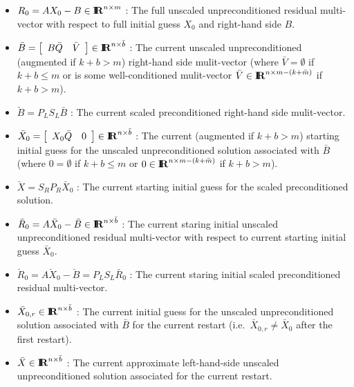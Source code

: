 \documentclass[pdf,ps2pdf,11pt]{SANDreport}
\begin{document}
\begin{itemize}

{}\item $R_0 = A X_0 - B {}\in\RE^{n {}\times m}$ : The full unscaled
unpreconditioned residual multi-vector with respect to full initial
guess $X_0$ and right-hand side $B$.

{}\item $\bar{B}={\bmat{cc} B \bar{Q} & \bar{V} \emat}\in\RE^{n
{}\times \bar{b}}$ : The current unscaled unpreconditioned (augmented
if $k+b > m$) right-hand side mulit-vector (where $\bar{V}=\emptyset$
if $k+b {}\leq m$ or is some well-conditioned mulit-vector
$\bar{V}\in\RE^{n {}\times m-(k+\bar{m})}$ if $k+b > m$).

{}\item $\breve{B} = P_L S_L \bar{B}$ : The current scaled
preconditioned right-hand side mulit-vector.

{}\item $\bar{X}_0={\bmat{cc} X_0 \bar{Q} & 0 \emat}\in\RE^{n {}\times
{}\bar{b}}$ : The current (augmented if $k+b > m$) starting initial
guess for the unscaled unpreconditioned solution associated with
$\bar{B}$ (where $0=\emptyset$ if $k+b {}\leq m$ or $0\in\RE^{n
{}\times m-(k+\bar{m})}$ if $k+b > m$).

{}\item $\breve{X} = S_R P_R \bar{X}_0$ : The current starting initial
guess for the scaled preconditioned solution.

{}\item $\bar{R}_0 = A \bar{X}_0 - \bar{B} {}\in\RE^{n {}\times
{}\bar{b}}$ : The current staring initial unscaled unpreconditioned
residual multi-vector with respect to current starting initial guess
$\bar{X}_0$.

{}\item $\breve{R}_0 = A \breve{X}_0 - \breve{B} = P_L S_L \bar{R}_0$
: The current staring initial scaled preconditioned residual
multi-vector.

{}\item $\bar{X}_{0,r}\in\RE^{n {}\times {}\bar{b}}$ : The current
initial guess for the unscaled unpreconditioned solution associated
with $\bar{B}$ for the current restart (i.e.~$\bar{X}_{0,r} {}\neq
\bar{X}_0$ after the first restart).

{}\item $\bar{X}\in\RE^{n {}\times {}\bar{b}}$ : The current
approximate left-hand-side unscaled unpreconditioned solution
associated for the current restart.


\end{itemize}
\end{document}
